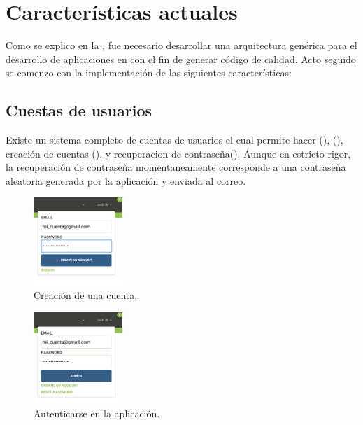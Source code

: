 \section{Características actuales}

Como se explico en la , fue necesario desarrollar una arquitectura genérica para el desarrollo de aplicaciones en \meteorNAME con el fin de generar código de calidad. Acto seguido se comenzo con la implementación de las siguientes características:

\subsection{Cuestas de usuarios}
 
Existe un sistema completo de cuentas de usuarios el cual permite hacer \loginCPT(), \logoutCPT(), creación de cuentas (), y recuperacion de contraseña(). Aunque en estricto rigor, la recuperación de contraseña momentaneamente corresponde a una contraseña aleatoria generada por la aplicación y enviada al correo.

\begin{figure}[H]
	\centering
	\includegraphics[width=0.3\textwidth]{figuras/accounts/create_account.png}

	\caption{Creación de una cuenta.}
	\label{figure:account:create_account}
\end{figure}

\begin{figure}[H]
	\centering
	\includegraphics[width=0.3\textwidth]{figuras/accounts/sign_in_ui.png}

	\caption{Autenticarse en la aplicación.}
	\label{figure:account:sign_in_ui}
\end{figure}


